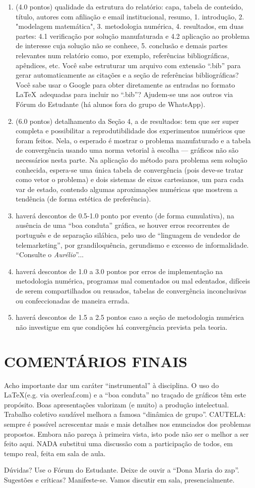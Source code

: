 \documentclass{article}
\begin{document}
\begin{enumerate}
  \item (4.0 pontos) qualidade da estrutura do relatório: capa, tabela de conteúdo, título, autores com afiliação e email institucional, resumo, 1. introdução, 2. "modelagem matemática", 3. metodologia numérica, 4. resultados, em duas partes: 4.1 verificação por solução manufaturada e 4.2 aplicação ao problema de interesse cuja solução não se conhece, 5. conclusão e demais partes relevantes num relatório como, por exemplo, referências bibliográficas, apêndices, etc. Você sabe estruturar um arquivo com extensão ``.bib'' para gerar automaticamente as citações e a seção de referências bi\-bliográficas? Você sabe usar o Google para obter diretamente as entradas  no formato \LaTeX\, adequadas para incluir no ``.bib''?  Ajudem-se uns aos outros via Fórum do Estudante (há alunos fora do grupo de WhatsApp).
  \item (6.0 pontos) detalhamento da Seção 4, a de resultados: tem que ser super completa e possibilitar a reprodutibilidade dos experimentos numéricos que foram feitos.  Nela,  o esperado é mostrar o problema manufaturado e a tabela de convergência usando uma norma vetorial à escolha --- gráficos não são necessários nesta parte. Na aplicação do método para problema sem solução conhecida, espera-se uma única tabela de convergência (pois deve-se tratar como vetor o problema) e dois sistemas de eixos cartesianos, um para cada var de estado, contendo algumas aproximações numéricas que mostrem a tendência (de forma estética de preferência). 
  \item haverá descontos de 0.5-1.0 ponto por evento (de forma cumulativa), na ausência de uma ``boa conduta'' gráfica, se houver erros recorrentes de português e de separação silábica, pelo uso de  ``linguagem de vendedor de telemarketing'', por grandiloquência, gerundismo e excesso de informalidade. ``Consulte o {\it Aurélio}''...
  \item haverá descontos de 1.0 a 3.0 pontos por erros de implementação na metodologia numérica, programas mal comentados ou mal edentados, difíceis de serem compartilhados ou reusados, tabelas de convergência inconclusivas ou confeccionadas de maneira errada.
  \item haverá descontos de 1.5 a 2.5 pontos caso a seção de metodologia numérica não investigue em que condições há convergência prevista pela teoria.
\end{enumerate}


\section{COMENTÁRIOS FINAIS}
    Acho importante dar um caráter ``instrumental'' à disciplina. O uso do \LaTeX\quad (e.g. via overleaf.com) e a ``boa conduta'' no traçado de gráficos têm este propósito. Boas apresentações valorizam (e muito) a produção intelectual. Trabalho coletivo saudável melhora a famosa ``dinâmica de grupo''. CAUTELA: sempre é possível acrescentar mais e mais detalhes nos enunciados dos problemas propostos. Embora não pareça à primeira vista, isto pode não ser o melhor a ser feito aqui. NADA substitui uma discussão com a participação de todos, em tempo real, feita em sala de aula.
    
\vspace{5mm}

\noindent
Dúvidas? Use o Fórum do Estudante. 
 Deixe de ouvir a ``Dona Maria do zap''. Sugestões e críticas? Manifeste-se. Vamos discutir em sala,  presencialmente. 
\end{document}
